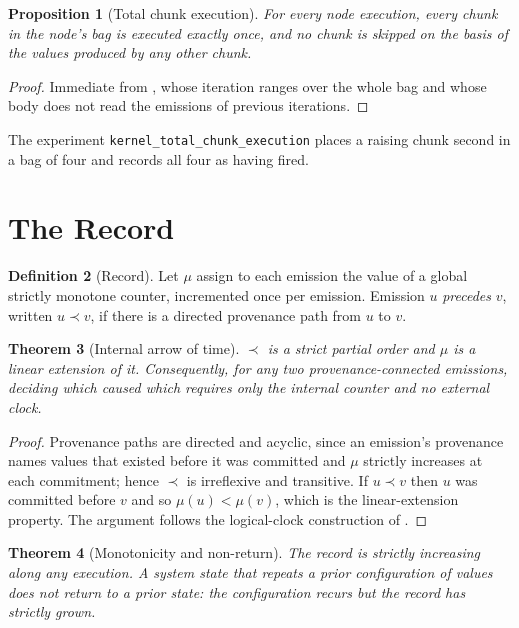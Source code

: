 \documentclass[11pt,twocolumn,a4paper]{article}
\newtheorem{theorem}{Theorem}[section]
\newtheorem{proposition}[theorem]{Proposition}
\theoremstyle{definition}
\newtheorem{definition}[theorem]{Definition}
\theoremstyle{remark}
\newcommand{\rec}{\mu}
\begin{document}
\begin{proposition}[Total chunk execution]
\label{prop:total}
For every node execution, every chunk in the node's bag is executed exactly once,
and no chunk is skipped on the basis of the values produced by any other chunk.
\end{proposition}

\begin{proof}
Immediate from , whose iteration ranges over the whole bag and
whose body does not read the emissions of previous iterations.
\end{proof}

The experiment \texttt{kernel\_total\_chunk\_execution} places a raising chunk
second in a bag of four and records all four as having fired.

\section{The Record}
\label{sec:record}

\begin{definition}[Record]
\label{def:record}
Let $\rec$ assign to each emission the value of a global strictly monotone
counter, incremented once per emission. Emission $u$ \emph{precedes} $v$, written
$u\prec v$, if there is a directed provenance path from $u$ to $v$.
\end{definition}

\begin{theorem}[Internal arrow of time]
\label{thm:arrow}
$\prec$ is a strict partial order and $\rec$ is a linear extension of it.
Consequently, for any two provenance-connected emissions, deciding which caused
which requires only the internal counter and no external clock.
\end{theorem}

\begin{proof}
Provenance paths are directed and acyclic, since an emission's provenance names
values that existed before it was committed and $\rec$ strictly increases at each
commitment; hence $\prec$ is irreflexive and transitive. If $u\prec v$ then $u$
was committed before $v$ and so $\rec(u)<\rec(v)$, which is the linear-extension
property. The argument follows the logical-clock construction of
\citet{lamport1978time}.
\end{proof}

\begin{theorem}[Monotonicity and non-return]
\label{thm:monotone}
The record is strictly increasing along any execution. A system state that
repeats a prior \emph{configuration} of values does not return to a prior
\emph{state}: the configuration recurs but the record has strictly grown.
\end{theorem}
\end{document}
